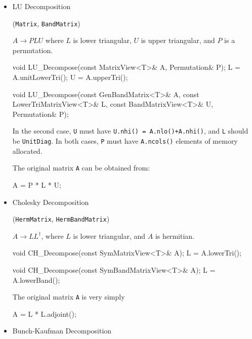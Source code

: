 \documentclass[twoside,letterpaper,11pt]{article}
\renewcommand{\tt}[1]{{\lstinline {#1}}}
\begin{document}
\begin{itemize}

\item LU Decomposition 

(\tt{Matrix}, \tt{BandMatrix})

$A \rightarrow P L U$ where $L$ is lower triangular, 
$U$ is upper triangular, and $P$ is a permutation.

\begin{tmvcode}
void LU_Decompose(const MatrixView<T>& A, Permutation& P);
L = A.unitLowerTri();
U = A.upperTri();

void LU_Decompose(const GenBandMatrix<T>& A, 
      const LowerTriMatrixView<T>& L, 
      const BandMatrixView<T>& U, Permutation& P);
\end{tmvcode}
In the second case, \tt{U} must have \tt{U.nhi() = A.nlo()+A.nhi()},
and \tt{L} should be \tt{UnitDiag}.
In both cases, \tt{P} must have \tt{A.ncols()} elements of memory allocated.

The original matrix \tt{A} can be obtained from:
\begin{tmvcode}
A = P * L * U;
\end{tmvcode}

\item Cholesky Decomposition 

(\tt{HermMatrix}, \tt{HermBandMatrix})

$A \rightarrow L L^\dagger$, where $L$ is lower triangular,
and $A$ is hermitian.

\begin{tmvcode}
void CH_Decompose(const SymMatrixView<T>& A);
L = A.lowerTri();

void CH_Decompose(const SymBandMatrixView<T>& A);
L = A.lowerBand();
\end{tmvcode}

The original matrix \tt{A} is very simply
\begin{tmvcode}
A = L * L.adjoint();
\end{tmvcode}

\item Bunch-Kaufman Decomposition 


\end{itemize}
\end{document}
